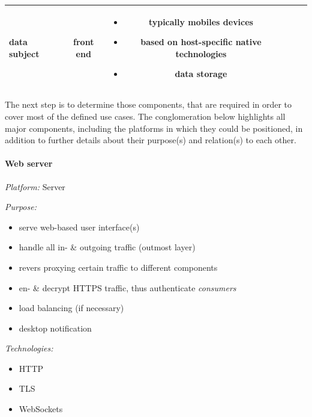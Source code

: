 \documentclass[12pt,english,a4paper,titlepage,cleardoublepage=empty,dottedtoc]{report}
\providecommand{\tightlist}{%
  \setlength{\itemsep}{0pt}\setlength{\parskip}{0pt}}
\begin{document}
\begin{longtable}[]{@{}lccccl@{}}
\begin{minipage}[t]{0.16\columnwidth}
data subject\strut
\end{minipage} & \begin{minipage}[t]{0.16\columnwidth}\centering\strut
front end\strut
\end{minipage} & \begin{minipage}[t]{0.16\columnwidth}\raggedright\strut
\begin{itemize}
\tightlist
\item
  typically mobiles devices
\item
  based on host-specific native technologies
\item
  data storage
\end{itemize}\strut
\end{minipage}\tabularnewline
\bottomrule
\end{longtable}

The next step is to determine those components, that are required in
order to cover most of the defined use cases. The conglomeration below
highlights all major components, including the platforms in which they
could be positioned, in addition to further details about their
purpose(s) and relation(s) to each other.

\paragraph{Web server}\label{web-server}

\emph{Platform:} Server

\emph{Purpose:}

\begin{itemize}
\tightlist
\item
  serve web-based user interface(s)
\item
  handle all in- \& outgoing traffic (outmost layer)
\item
  revers proxying certain traffic to different components
\item
  en- \& decrypt HTTPS traffic, thus authenticate \emph{consumers}
\item
  load balancing (if necessary)
\item
  desktop notification
\end{itemize}

\emph{Technologies:}

\begin{itemize}
\tightlist
\item
  HTTP
\item
  TLS
\item
  WebSockets
\end{itemize}
\end{document}
